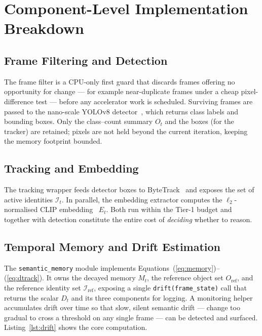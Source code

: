 \section{Component-Level Implementation Breakdown}
\label{sec:arch-components}

\subsection{Frame Filtering and Detection}
\label{sec:arch-detection}

The frame filter is a CPU-only first guard that discards frames offering no
opportunity for change --- for example near-duplicate frames under a cheap
pixel-difference test --- before any accelerator work is scheduled. Surviving
frames are passed to the nano-scale YOLOv8 detector~\cite{Jocher2023YOLOv8},
which returns class labels and bounding boxes. Only the class--count summary
$O_t$ and the boxes (for the tracker) are retained; pixels are not held beyond
the current iteration, keeping the memory footprint bounded.

\subsection{Tracking and Embedding}
\label{sec:arch-track-embed}

The tracking wrapper feeds detector boxes to ByteTrack~\cite{Zhang2022ByteTrack}
and exposes the set of active identities $\mathcal{I}_t$. In parallel, the
embedding extractor computes the $\ell_2$-normalised CLIP
embedding~\cite{Radford2021CLIP} $E_t$. Both run within the Tier-1 budget and
together with detection constitute the entire cost of \emph{deciding} whether
to reason.

\subsection{Temporal Memory and Drift Estimation}
\label{sec:arch-drift}

The \texttt{semantic\_memory} module implements
Equations~(\ref{eq:memory})--(\ref{eq:dtrack}). It owns the decayed memory
$M_t$, the reference object set $O_{\text{ref}}$, and the reference identity
set $\mathcal{I}_{\text{ref}}$, exposing a single \texttt{drift(frame\_state)}
call that returns the scalar $D_t$ and its three components for logging.
A monitoring helper accumulates drift over time so that slow, silent semantic
drift --- change too gradual to cross a threshold on any single frame --- can be
detected and surfaced. Listing~\ref{lst:drift} shows the core computation.

